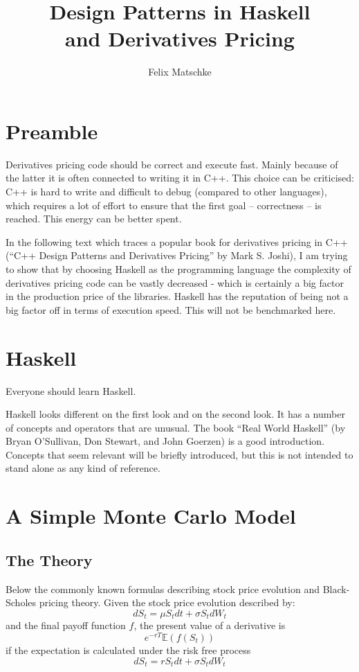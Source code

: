 \documentclass{scrartcl}
\title{Design Patterns in Haskell \\ and Derivatives Pricing}
\author{Felix Matschke}
\begin{document}
\maketitle
\tableofcontents
\clearpage

\section{Preamble}

Derivatives pricing code should be correct and execute fast. Mainly because of the latter it is often connected to writing it in C++. This choice can be criticised: C++ is hard to write and difficult to debug (compared to other languages), which requires a lot of effort to ensure that the first goal -- correctness -- is reached. This energy can be better spent.

In the following text which traces a popular book for derivatives pricing in C++ (``C++ Design Patterns and Derivatives Pricing'' by Mark S. Joshi), I am trying to show that by choosing Haskell as the programming language the complexity of derivatives pricing code can be vastly decreased - which is certainly a big factor in the production price of the libraries. Haskell has the reputation of being not a big factor off in terms of execution speed. This will not be benchmarked here.

\section{Haskell}

Everyone should learn Haskell.

Haskell looks different on the first look and on the second look. It has a number of concepts and operators that are unusual. The book ``Real World Haskell'' (by Bryan O'Sullivan, Don Stewart, and John Goerzen) is a good introduction. Concepts that seem relevant will be briefly introduced, but this is not intended to stand alone as any kind of reference.

\section{A Simple Monte Carlo Model}
\subsection{The Theory}
Below the commonly known formulas describing stock price evolution and Black-Scholes pricing theory. Given the stock price evolution described by:
\begin{equation}
  dS_t = \mu S_t dt + \sigma S_t dW_t
\end{equation}
and the final payoff function $f$, the present value of a derivative is
\begin{equation}
  e^{-rT}\mathbb{E}(f(S_t))
\end{equation}
if the expectation is calculated under the risk free process
\begin{equation}
  dS_t = r S_t dt + \sigma S_t dW_t
\end{equation}
\end{document}
